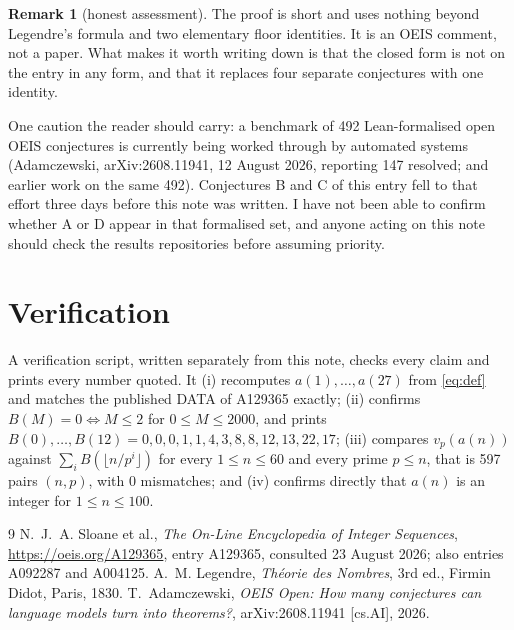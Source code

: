 \documentclass[11pt,a4paper]{article}
\theoremstyle{plain}
\theoremstyle{definition}
\newtheorem*{remark}{Remark}
\begin{document}
\begin{remark}[honest assessment]
The proof is short and uses nothing beyond Legendre's formula and two elementary floor
identities. It is an OEIS comment, not a paper. What makes it worth writing down is that
the closed form is not on the entry in any form, and that it replaces four separate
conjectures with one identity.

One caution the reader should carry: a benchmark of 492 Lean-formalised open OEIS
conjectures is currently being worked through by automated systems (Adamczewski,
arXiv:2608.11941, 12 August 2026, reporting 147 resolved; and earlier work on the same
492). Conjectures B and C of this entry fell to that effort three days before this note was
written. I have not been able to confirm whether A or D appear in that formalised set, and
anyone acting on this note should check the results repositories before assuming priority.
\end{remark}

\section{Verification}

A verification script, written separately from this note, checks every claim and prints
every number quoted. It (i) recomputes $a(1),\dots,a(27)$ from \eqref{eq:def} and matches
the published DATA of A129365 exactly; (ii) confirms $B(M)=0\iff M\le2$ for
$0\le M\le2000$, and prints $B(0),\dots,B(12)=0,0,0,1,1,4,3,8,8,12,13,22,17$;
(iii) compares $v_{p}(a(n))$ against $\sum_{i}B(\lfloor n/p^{i}\rfloor)$ for every
$1\le n\le60$ and every prime $p\le n$, that is 597 pairs $(n,p)$, with 0 mismatches; and
(iv) confirms directly that $a(n)$ is an integer for $1\le n\le100$.

\begin{thebibliography}{9}
 N.~J.~A. Sloane et al., \emph{The On-Line Encyclopedia of Integer
Sequences}, \url{https://oeis.org/A129365}, entry A129365, consulted 23 August 2026; also
entries A092287 and A004125.
 A.~M. Legendre, \emph{Th\'eorie des Nombres}, 3rd ed., Firmin Didot,
Paris, 1830.
 T.~Adamczewski, \emph{OEIS Open: How many conjectures can language models
turn into theorems?}, arXiv:2608.11941 [cs.AI], 2026.
\end{thebibliography}
\end{document}
